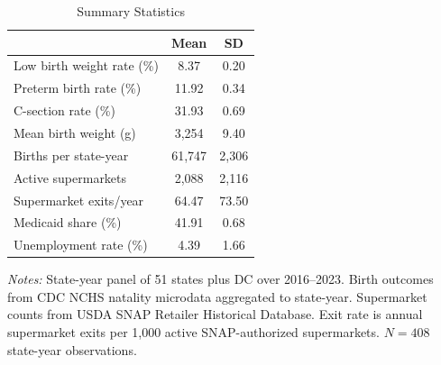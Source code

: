\begin{table}[htbp]
\centering
\begin{threeparttable}
\caption{Summary Statistics}
\label{tab:summary}
\begin{tabular}{lcc}
\hline\hline
 & Mean & SD \\
\hline
  Low birth weight rate (\%) & 8.37 & 0.20 \\
  Preterm birth rate (\%) & 11.92 & 0.34 \\
  C-section rate (\%) & 31.93 & 0.69 \\
  Mean birth weight (g) &  3,254 & 9.40 \\
  Births per state-year & 61,747 & 2,306 \\
  Active supermarkets &  2,088 & 2,116 \\
  Supermarket exits/year & 64.47 & 73.50 \\
  Medicaid share (\%) & 41.91 & 0.68 \\
  Unemployment rate (\%) & 4.39 & 1.66 \\
\hline\hline
\end{tabular}
\begin{tablenotes}[flushleft]
\footnotesize
\item \textit{Notes:} State-year panel of 51 states plus DC over 2016--2023.
Birth outcomes from CDC NCHS natality microdata aggregated to state-year.
Supermarket counts from USDA SNAP Retailer Historical Database.
Exit rate is annual supermarket exits per 1,000 active SNAP-authorized supermarkets.
$N = 408$ state-year observations.
\end{tablenotes}
\end{threeparttable}
\end{table}
